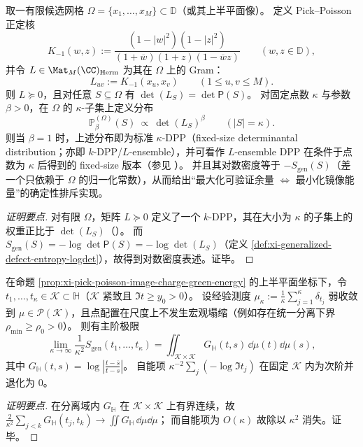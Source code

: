 \begin{proposition}\label{prop:xi-pick-poisson-kdpp}
取一有限候选网格 \(\Omega=\{x_1,\dots,x_M\}\subset\mathbb{D}\)（或其上半平面像）。
定义 Pick--Poisson 正定核
\[
K_{-1}(w,z):=\frac{(1-|w|^2)(1-|z|^2)}{(1+\overline w)(1+z)(1-\overline w z)}\qquad(w,z\in\mathbb{D}),
\]
并令 \(L\in\Mat_M(\CC)_{\mathrm{Herm}}\) 为其在 \(\Omega\) 上的 Gram：
\[
L_{uv}:=K_{-1}(x_u,x_v)\qquad(1\le u,v\le M).
\]
则 \(L\succeq 0\)，且对任意 \(S\subseteq\Omega\) 有 \(\det(L_S)=\det\mathsf P(S)\)。
对固定点数 \(\kappa\) 与参数 \(\beta>0\)，在 \(\Omega\) 的 \(\kappa\)-子集上定义分布
\[
\mathbb{P}_{\beta}^{(\Omega)}(S)\ \propto\ \det(L_S)^{\beta}\qquad(|S|=\kappa).
\]
则当 \(\beta=1\) 时，上述分布即为标准 \(\kappa\)-DPP（fixed-size determinantal distribution；亦即 \(k\)-DPP/\(L\)-ensemble），并可看作 \(L\)-ensemble DPP 在条件于点数为 \(\kappa\) 后得到的 fixed-size 版本（参见 \cite{KuleszaTaskar2012DPP}）。
并且其对数密度等于 \(-S_{\mathrm{gen}}(S)\)（差一个只依赖于 \(\Omega\) 的归一化常数），从而给出“最大化可验证余量 \(\Longleftrightarrow\) 最小化镜像能量”的确定性排斥实现。
\end{proposition}
\begin{proof}[证明要点]
对有限 \(\Omega\)，矩阵 \(L\succeq 0\) 定义了一个 \(k\)-DPP，其在大小为 \(\kappa\) 的子集上的权重正比于 \(\det(L_S)\)（\cite{KuleszaTaskar2012DPP}）。
而 \(S_{\mathrm{gen}}(S)=-\log\det\mathsf P(S)=-\log\det(L_S)\)（定义 \ref{def:xi-generalized-defect-entropy-logdet}），故得到对数密度表述。证毕。
\end{proof}

\begin{proposition}\label{prop:xi-pick-poisson-meanfield-template}
在命题 \ref{prop:xi-pick-poisson-image-charge-green-energy} 的上半平面坐标下，令 \(t_1,\dots,t_\kappa\in\mathcal{K}\subset\mathbb{H}\)（\(\mathcal{K}\) 紧致且 \(\Im t\ge y_0>0\)）。
设经验测度 \(\mu_\kappa:=\frac{1}{\kappa}\sum_{j=1}^{\kappa}\delta_{t_j}\) 弱收敛到 \(\mu\in\mathcal{P}(\mathcal{K})\)，且点配置在尺度上不发生宏观塌缩（例如存在统一分离下界 \(\rho_{\min}\ge\rho_0>0\)）。
则有主阶极限
\[
\boxed{\;
\lim_{\kappa\to\infty}\frac{1}{\kappa^2}S_{\mathrm{gen}}(t_1,\dots,t_\kappa)
=\iint_{\mathcal{K}\times\mathcal{K}}G_{\mathbb{H}}(t,s)\,\dd\mu(t)\dd\mu(s),\;}
\]
其中 \(G_{\mathbb{H}}(t,s)=\log\left|\frac{t-\overline s}{t-s}\right|\)。
自能项 \(\kappa^{-2}\sum_j(-\log\Im t_j)\) 在固定 \(\mathcal{K}\) 内为次阶并退化为 \(0\)。
\end{proposition}
\begin{proof}[证明要点]
在分离域内 \(G_{\mathbb{H}}\) 在 \(\mathcal{K}\times\mathcal{K}\) 上有界连续，故
\(
\frac{2}{\kappa^2}\sum_{j<k}G_{\mathbb{H}}(t_j,t_k)
\to \iint G_{\mathbb{H}}\,\dd\mu\dd\mu
\)；
而自能项为 \(O(\kappa)\) 故除以 \(\kappa^2\) 消失。证毕。
\end{proof}


